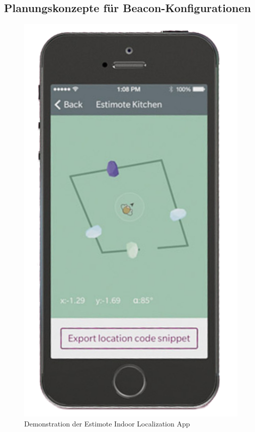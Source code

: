 \subsection{Planungskonzepte für Beacon-Konfigurationen}
\begin{figure}
\centering
\includegraphics[scale=0.23]{Bilder/TrackEstimote}
\caption{Demonstration der Estimote Indoor Localization App \cite{TrEs}}
\label{fig:EstiPlan}
\end{figure}
